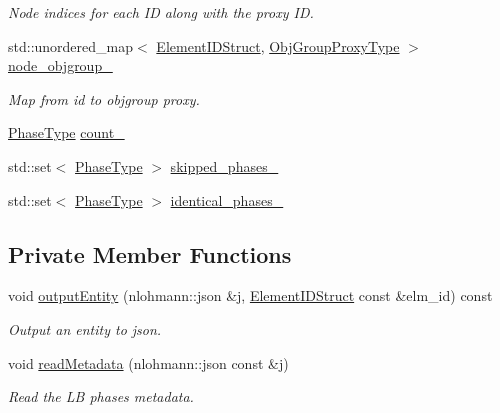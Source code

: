 \begin{DoxyCompactItemize}
\begin{DoxyCompactList}\small\item\em Node indices for each ID along with the proxy ID. \end{DoxyCompactList}\item 
std\+::unordered\+\_\+map$<$ \hyperlink{namespacevt_1_1vrt_1_1collection_1_1balance_a9f5b53fafb270212279a4757d2c4cd28}{Element\+I\+D\+Struct}, \hyperlink{namespacevt_ad7cae989df485fccca57f0792a880a8e}{Obj\+Group\+Proxy\+Type} $>$ \hyperlink{structvt_1_1vrt_1_1collection_1_1balance_1_1_l_b_data_holder_ab862d2f1b884256fc88634757f37bb80}{node\+\_\+objgroup\+\_\+}
\begin{DoxyCompactList}\small\item\em Map from id to objgroup proxy. \end{DoxyCompactList}\item 
\hyperlink{namespacevt_a46ce6733d5cdbd735d561b7b4029f6d7}{Phase\+Type} \hyperlink{structvt_1_1vrt_1_1collection_1_1balance_1_1_l_b_data_holder_ac7d4f40440b458c101af292dd3357558}{count\+\_\+}
\item 
std\+::set$<$ \hyperlink{namespacevt_a46ce6733d5cdbd735d561b7b4029f6d7}{Phase\+Type} $>$ \hyperlink{structvt_1_1vrt_1_1collection_1_1balance_1_1_l_b_data_holder_a66a5410c689d1515c9462495d3225a79}{skipped\+\_\+phases\+\_\+}
\item 
std\+::set$<$ \hyperlink{namespacevt_a46ce6733d5cdbd735d561b7b4029f6d7}{Phase\+Type} $>$ \hyperlink{structvt_1_1vrt_1_1collection_1_1balance_1_1_l_b_data_holder_a190018ee0726acb12d7d416476de5bfd}{identical\+\_\+phases\+\_\+}
\end{DoxyCompactItemize}
\subsection*{Private Member Functions}
\begin{DoxyCompactItemize}
\item 
void \hyperlink{structvt_1_1vrt_1_1collection_1_1balance_1_1_l_b_data_holder_a6671c7581a2547eec99e096f956efeb2}{output\+Entity} (nlohmann\+::json \&j, \hyperlink{namespacevt_1_1vrt_1_1collection_1_1balance_a9f5b53fafb270212279a4757d2c4cd28}{Element\+I\+D\+Struct} const \&elm\+\_\+id) const
\begin{DoxyCompactList}\small\item\em Output an entity to json. \end{DoxyCompactList}\item 
void \hyperlink{structvt_1_1vrt_1_1collection_1_1balance_1_1_l_b_data_holder_a5cd0145d09eb1b0a1bdf6b5b6853267d}{read\+Metadata} (nlohmann\+::json const \&j)
\begin{DoxyCompactList}\small\item\em Read the LB phase\textquotesingle{}s metadata. \end{DoxyCompactList}\end{DoxyCompactItemize}


